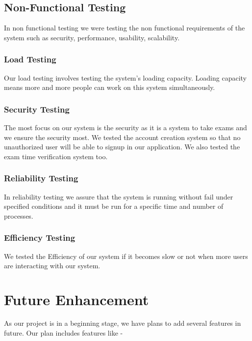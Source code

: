\documentclass[10pt]{article}
\begin{document}
\subsection{Non-Functional Testing}

In non functional testing we were testing the non functional requirements of the system such as security, performance, usability, scalability.

\subsubsection{Load Testing}

Our load testing involves testing the system's loading capacity. Loading capacity means more and more people can work on this system simultaneously.

\subsubsection{Security Testing}

The most focus on our system is the security as it is a system to take exams and we ensure the security most. We tested the account creation system so that no unauthorized user will be able to signup in our application. We also tested the exam time verification system too.


\subsubsection{Reliability Testing}

In reliability testing we assure that the system is running without fail under specified conditions and it must be run for a specific time and number of processes.

\subsubsection{Efficiency Testing}

We tested the Efficiency of our system if it becomes slow or not when more users are interacting with our system.


\section{Future Enhancement}

As our project is in a beginning stage, we have plans to add several features in future.  Our plan includes features like -
\end{document}
